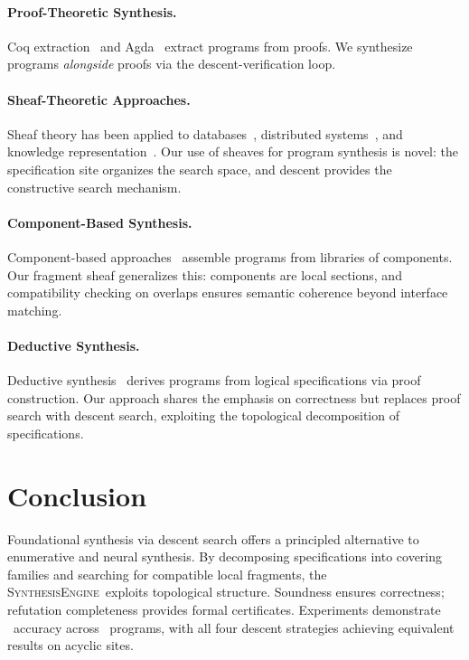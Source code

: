 \documentclass[11pt]{article}
\newcommand{\SynthEngine}{\textsc{SynthesisEngine}}
\begin{document}
\paragraph{Proof-Theoretic Synthesis.}
Coq extraction~\cite{Letouzey2008} and Agda~\cite{Norell2009}
extract programs from proofs.  We synthesize programs \emph{alongside}
proofs via the descent-verification loop.

\paragraph{Sheaf-Theoretic Approaches.}
Sheaf theory has been applied to databases~\cite{Goguen1992},
distributed systems~\cite{Abramsky2011}, and knowledge
representation~\cite{Robinson2014}.  Our use of sheaves for
program synthesis is novel: the specification site organizes the
search space, and descent provides the constructive search mechanism.

\paragraph{Component-Based Synthesis.}
Component-based approaches~\cite{Jha2010,Feng2017} assemble
programs from libraries of components.  Our fragment sheaf
generalizes this: components are local sections, and compatibility
checking on overlaps ensures semantic coherence beyond interface
matching.

\paragraph{Deductive Synthesis.}
Deductive synthesis~\cite{Manna1980,Green1981} derives programs
from logical specifications via proof construction.  Our approach
shares the emphasis on correctness but replaces proof search with
descent search, exploiting the topological decomposition of
specifications.

\section{Conclusion}\label{sec:conclusion}

Foundational synthesis via descent search offers a principled
alternative to enumerative and neural synthesis.  By decomposing
specifications into covering families and searching for compatible
local fragments, the \SynthEngine\ exploits topological structure.
Soundness ensures correctness; refutation completeness provides
formal certificates.  Experiments demonstrate \compOverallAccuracy\
accuracy across \expTotalPrograms\ programs, with all four descent
strategies achieving equivalent results on acyclic sites.
\end{document}
